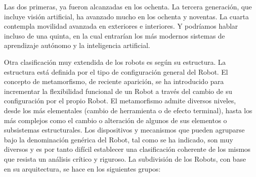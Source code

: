 Las dos primeras, ya fueron alcanzadas en los ochenta. La tercera generación, que incluye visión artificial, ha avanzado mucho en los ochenta y noventas. La cuarta contempla movilidad avanzada en exteriores e interiores. Y podríamos hablar incluso de una quinta, en la cual entrarían los más modernos sistemas de aprendizaje autónomo y la inteligencia artificial.

Otra clasificación muy extendida de los robots es según su estructura. La estructura está definida por el tipo de configuración general del Robot. El concepto de metamorfismo, de reciente aparición, se ha introducido para incrementar la flexibilidad funcional de un Robot a través del cambio de su configuración por el propio Robot. El metamorfismo admite diversos niveles, desde los más elementales (cambio de herramienta o de efecto terminal), hasta los más complejos como el cambio o alteración de algunos de sus elementos o subsistemas estructurales. Los dispositivos y mecanismos que pueden agruparse bajo la denominación genérica del Robot, tal como se ha indicado, son muy diversos y es por tanto difícil establecer una clasificación coherente de los mismos que resista un análisis crítico y riguroso. La subdivisión de los Robots, con base en su arquitectura, se hace en los siguientes grupos: 
